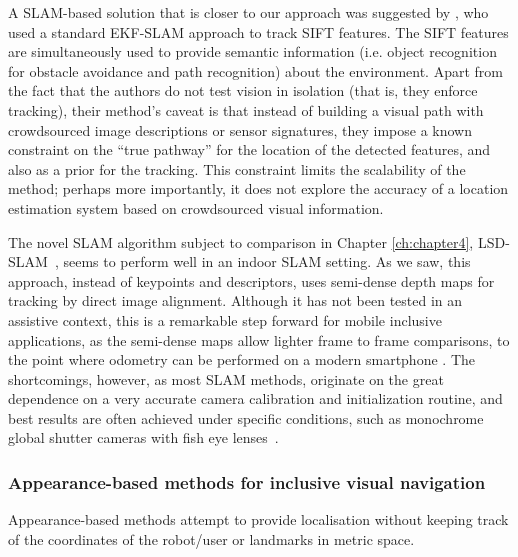 

A SLAM-based solution that is closer to our approach was suggested by \citet{ali2010indoor}, who used a standard EKF-SLAM approach to track SIFT features. The SIFT features are simultaneously used to provide semantic information (i.e. object recognition for obstacle avoidance and path recognition) about the environment. Apart from the fact that the authors do not test vision in isolation (that is, they enforce tracking), their method's caveat is that instead of building a visual path with crowdsourced image descriptions or sensor signatures, they impose a known constraint on the ``true pathway'' for the location of the detected features, and also as a prior for the tracking. This constraint limits the scalability of the method; perhaps more importantly, it does not explore the accuracy of a location estimation system based on crowdsourced visual information.

The novel SLAM algorithm subject to comparison in Chapter \ref{ch:chapter4}, LSD-SLAM~\citep{engel14eccv}, seems to perform well in an indoor SLAM setting. As we saw, this approach, instead of keypoints and descriptors, uses semi-dense depth maps for tracking by direct image alignment. Although it has not been tested in an assistive context, this is a remarkable step forward for mobile inclusive applications, as the semi-dense maps allow lighter frame to frame comparisons, to the point where odometry can be performed on a modern smartphone \citep{schoeps14ismar}. The shortcomings, however, as most SLAM methods, originate on the great dependence on a very accurate camera calibration and initialization routine, and best results are often achieved under specific conditions, such as monochrome global shutter cameras with fish eye lenses~\citep{engel14eccv}.

\subsubsection{Appearance-based methods for inclusive visual navigation}

Appearance-based methods attempt to provide localisation without keeping track of the coordinates of the robot/user or landmarks in metric space. 

